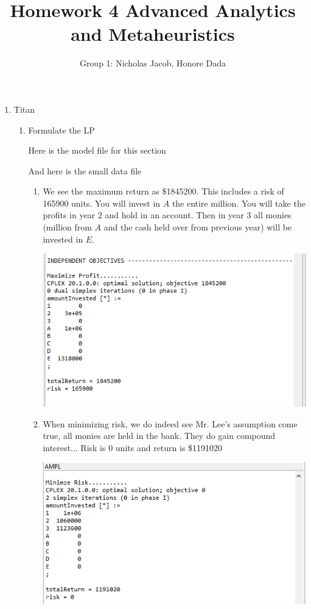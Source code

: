 \documentclass[11pt]{article}
\author{Group 1:  Nicholas Jacob, Honore Dada}
\title{Homework 4 Advanced Analytics and Metaheuristics}
\begin{document}
\maketitle

\begin{enumerate}
\item Titan
\begin{enumerate}

\item Formulate the LP

Here is the model file for this section

{\tiny {}}

And here is the small data file

{\tiny {}}

\begin{enumerate}
\item We see the maximum return as \$1845200.  This includes a risk of 165900 units.  You will invest in $A$ the entire million.  You will take the profits in year 2 and hold in an account.  Then in year 3 all monies (million from $A$ and the cash held over from previous year) will be invested in $E$.

\includegraphics[width = .9\textwidth]{output1ai.png}

\item When minimizing risk, we do indeed see Mr. Lee's assumption come true, all monies are held in the bank.  They do gain compound interest...  Risk is 0 units and return is \$1191020

 \includegraphics[width = .9\textwidth]{output1aii.png}


\end{enumerate}
\end{enumerate}
\end{enumerate}
\end{document}
